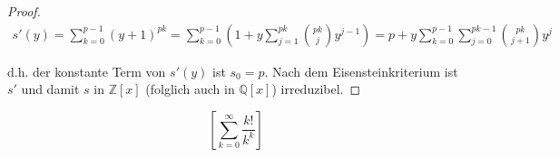 \documentclass[a4paper]{article}
\begin{document}
\begin{enumerate}
\begin{proof}
	\begin{align*}
		s'(y) = \sum_{k=0}^{p-1}(y+1)^{pk} = \sum_{k=0}^{p-1} \left(1+y\sum_{j=1}^{pk} {pk \choose j}y^{j-1} \right) = 
		p + y\sum_{k=0}^{p-1}\sum_{j=0}^{pk-1} {pk \choose j+1}y^{j} 
	\end{align*}


		d.h. der konstante Term von $s'(y)$ ist $s_0 = p$. Nach dem Eisensteinkriterium ist $s'$ und damit $s$ in $\mathbb{Z}[x]$ (folglich auch in $\mathbb{Q}[x]$) irreduzibel.

	\end{proof}
	
	$$\left[ \sum_{k=0}^{\infty} \frac{k!}{k^k}\right]$$

	\end{enumerate}
\end{document}
